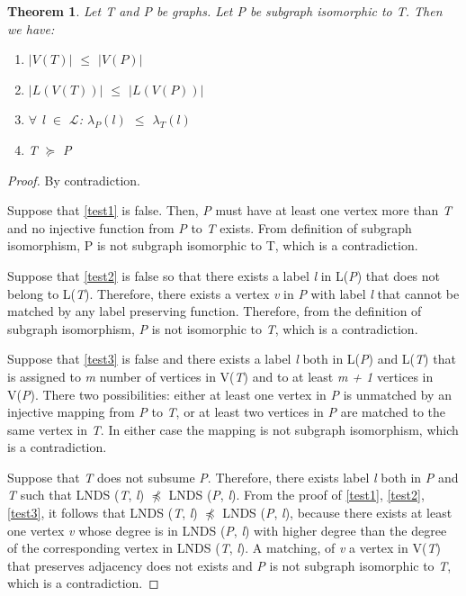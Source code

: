 \documentclass{l4proj}
\newtheorem{theorem}{Theorem}[section]
\newcommand{\Lagr}{\mathcal{L}}
\begin{document}
\begin{theorem}
\label{th:nds}
Let \emph{T} and \emph{P} be graphs. Let \emph{P} be subgraph isomorphic to \emph{T}. Then we have:
\begin{enumerate}
\item \label{test1} $|V(T)|$ $\leq$ $|V(P)|$
\item \label{test2} $|L(V(T))|$ $\leq$ $|L(V(P))|$
\item \label{test3} $\forall$ \emph{l} $\in$ $\Lagr$: $\lambda_{P}(l)$ $\leq$ $\lambda_{T}(l)$
\item \label{test4} T $\succeq$ P
\end{enumerate}
\end{theorem}

\begin{proof}
By contradiction.

Suppose that \ref{test1} is false. Then, \emph{P} must have at least one vertex more than \emph{T} and no injective function from \emph{P} to \emph{T} exists. From definition of subgraph isomorphism, P is not subgraph isomorphic to T, which is a contradiction.

Suppose that \ref{test2} is false so that there exists a label \emph{l} in L(\emph{P}) that does not belong to L(\emph{T}). Therefore, there exists a vertex \emph{v} in \emph{P} with label \emph{l} that cannot be matched by any label preserving function. Therefore, from the definition of subgraph isomorphism, \emph{P} is not isomorphic to \emph{T}, which is a contradiction.

Suppose that \ref{test3} is false and there exists a label \emph{l} both in L(\emph{P}) and L(\emph{T}) that is assigned to \emph{m} number of vertices in V(\emph{T}) and to at least \emph{m + 1} vertices in V(\emph{P}). There two possibilities: either at least one vertex in \emph{P} is unmatched by an injective mapping from \emph{P} to \emph{T}, or at least two vertices in \emph{P} are matched to the same vertex in \emph{T}. In either case the mapping is not subgraph isomorphism, which is a contradiction.

Suppose that \emph{T} does not subsume \emph{P}. Therefore, there exists label \emph{l} both in \emph{P} and \emph{T} such that LNDS (\emph{T}, \emph{l}) $\npreceq$ LNDS (\emph{P}, \emph{l}). From the proof of \ref{test1}, \ref{test2}, \ref{test3}, it follows that LNDS (\emph{T}, \emph{l}) $\npreceq$ LNDS (\emph{P}, \emph{l}), because there exists at least one vertex \emph{v} whose degree is in LNDS (\emph{P}, \emph{l}) with higher degree than the degree of the corresponding vertex  in LNDS (\emph{T}, \emph{l}). A matching, of \emph{v} a vertex in V(\emph{T}) that preserves adjacency does not exists and \emph{P} is not subgraph isomorphic to \emph{T}, which is a contradiction.
\end{proof}
\end{document}
